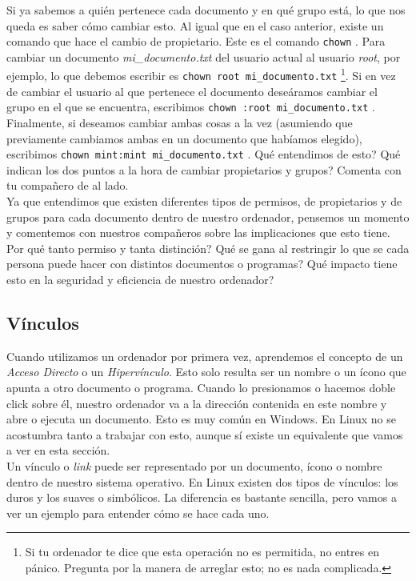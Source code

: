 \documentclass[10pt,letterpaper]{article}
\newcommand{\inlinecode}[1]{
\colorbox{light-gray}{\texttt{#1}}
}
\begin{document}
Si ya sabemos a qui\'en pertenece cada documento y en qu\'e grupo est\'a, lo que nos queda es saber c\'omo cambiar esto. Al igual que en el caso anterior, existe un comando que hace el cambio de propietario. Este es el comando \inlinecode{chown}. Para cambiar un documento \textit{mi\_documento.txt} del usuario actual al usuario \textit{root}, por ejemplo, lo que debemos escribir es \inlinecode{chown root mi\_documento.txt}\footnote{Si tu ordenador te dice que esta operaci\'on no es permitida, no entres en p\'anico. Pregunta por la manera de arreglar esto; no es nada complicada.}. Si en vez de cambiar el usuario al que pertenece el documento dese\'aramos cambiar el grupo en el que se encuentra, escribimos \inlinecode{chown :root mi\_documento.txt}. Finalmente, si deseamos cambiar ambas cosas a la vez (asumiendo que previamente cambiamos ambas en un documento que hab\'iamos elegido), escribimos \inlinecode{chown mint:mint mi\_documento.txt}. Qu\'e entendimos de esto? Qu\'e indican los dos puntos a la hora de cambiar propietarios y grupos? Comenta con tu compa\~nero de al lado.\\

Ya que entendimos que existen diferentes tipos de permisos, de propietarios y de grupos para cada documento dentro de nuestro ordenador, pensemos un momento y comentemos con nuestros compa\~neros sobre las implicaciones que esto tiene. Por qu\'e tanto permiso y tanta distinci\'on? Qu\'e se gana al restringir lo que se cada persona puede hacer con distintos documentos o programas? Qu\'e impacto tiene esto en la seguridad y eficiencia de nuestro ordenador?

\subsection{V\'inculos}
Cuando utilizamos un ordenador por primera vez, aprendemos el concepto de un \emph{Acceso Directo} o un \emph{Hiperv\'inculo}. Esto solo resulta ser un nombre o un \'icono que apunta a otro documento o programa. Cuando lo presionamos o hacemos doble click sobre \'el, nuestro ordenador va a la direcci\'on contenida en este nombre y abre o ejecuta un documento. Esto es muy com\'un en Windows. En Linux no se acostumbra tanto a trabajar con esto, aunque s\'i existe un equivalente que vamos a ver en esta secci\'on.\\

Un v\'inculo o \emph{link} puede ser representado por un documento, \'icono o nombre dentro de nuestro sistema operativo. En Linux existen dos tipos de v\'inculos: los duros y los suaves o simb\'olicos. La diferencia es bastante sencilla, pero vamos a ver un ejemplo para entender c\'omo se hace cada uno.
\end{document}

